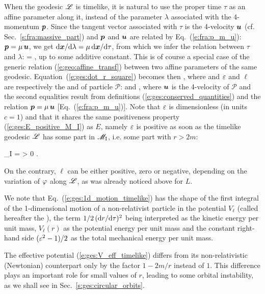 When the geodesic $\mathscr{L}$ is timelike, it is natural to use the proper time $\tau$
as an affine parameter along it, instead of the parameter $\lambda$ associated
with the 4-momentum $\bm{p}$. Since the tangent vector associated with $\tau$
is the 4-velocity $\bm{u}$ (cf. Sec.~\ref{s:fra:massive_part}) and $\bm{p}$ and $\bm{u}$ are related by
Eq.~(\ref{e:fra:p_m_u}): $\bm{p} = \mu \, \bm{u}$, we get
$\mathrm{d}\bm{x}/\mathrm{d}\lambda = \mu \, \mathrm{d}\bm{x}/\mathrm{d}\tau$, from which we infer the relation
between $\tau$ and $\lambda$:
\be
    \tau = \mu \lambda ,
\ee
up to some additive constant. This is
of course a special case of the generic relation (\ref{e:geo:affine_transf})
between two affine parameters of the same geodesic.
Equation~(\ref{e:ges:dot_r_square}) becomes then
\be \label{e:ges:1d_motion_timelike}
     ,
\ee
where
\be \label{e:ges:V_eff_timelike}
\ee
and $\varepsilon$ and $\ell$ are respectively the
and 
of particle $\mathscr{P}$:
\be \label{e:ges:def_eps_ell}
  \qquad\mbox{and}\qquad
   ,
\ee
where $\bm{u}$ is the 4-velocity of $\mathscr{P}$ and the second equalities
result from definitions (\ref{e:ges:conserved_quantities})
and the relation $\bm{p} = \mu \, \bm{u}$ [Eq.~(\ref{e:fra:p_m_u})].
Note that $\varepsilon$ is dimensionless (in units $c=1$) and that it shares the
same positiveness property (\ref{e:ges:E_positive_M_I}) as $E$,
namely $\varepsilon$ is positive as soon as the timelike geodesic $\mathscr{L}$ has some part
in $\mathscr{M}_{\rm I}$, i.e. some part with $r>2m$:
\begin{greybox}
\be \label{e:ges:eps_positive_M_I}
    \Li \cap \M_{\rm I} \not= \varnothing \quad \Longrightarrow \quad \veps > 0 .
\ee
\end{greybox}
On the contrary, $\ell$ can be either positive, zero or negative, depending
on the variation of $\varphi$ along $\mathscr{L}$, as was already noticed above for $L$.

We note that Eq.~(\ref{e:ges:1d_motion_timelike}) has the shape of the
first integral of the
1-dimensional motion of a non-relativist particle in the potential
$V_{\ell}$ (called hereafter the ), the term $1/2 \, (\mathrm{d} r/\mathrm{d}\tau)^2$ being interpreted as
the kinetic energy per unit mass, $V_{\ell}(r)$ as the potential
energy per unit mass and the constant right-hand side $(\varepsilon^2-1)/2$ as the total
mechanical energy per unit mass.
\begin{remark} \label{r:ges:V_eff_Newt}
The effective potential (\ref{e:ges:V_eff_timelike}) differs from its
non-relativistic (Newtonian) counterpart only by the factor $1-2m/r$ instead of
$1$. This difference plays an important role for small values of $r$,
leading to some orbital instability, as we shall see in Sec.~\ref{s:ges:circular_orbits}.
\end{remark}

